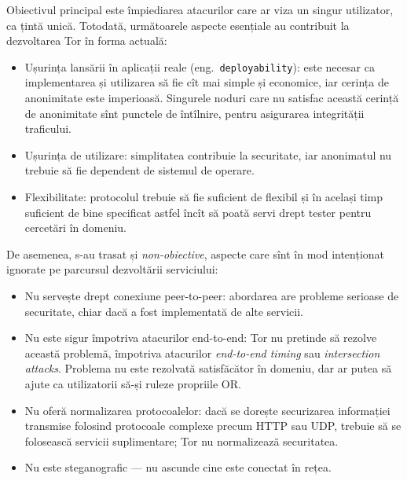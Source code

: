 \indent\indent Obiectivul principal este împiediarea atacurilor care ar viza un singur
utilizator, ca țintă unică. Totodată, următoarele aspecte esențiale au
contribuit la dezvoltarea Tor în forma actuală:
\begin{itemize}
  \item Ușurința lansării în aplicații reale (eng.\ \texttt{deployability}): este
    necesar ca implementarea și utilizarea să fie cît mai simple și
    economice, iar cerința de anonimitate este imperioasă. Singurele
    noduri care nu satisfac această cerință de anonimitate sînt punctele
    de întîlnire, pentru asigurarea integrității traficului.
  \item Ușurința de utilizare: simplitatea contribuie la se\-cu\-ri\-ta\-te, iar
    a\-no\-ni\-ma\-tul nu tre\-bu\-ie să fie dependent de sistemul de operare.
  \item Flexibilitate: protocolul trebuie să fie suficient de flexibil și
    în același timp suficient de bine specificat astfel încît să poată
    servi drept tester pentru cercetări în domeniu.
\end{itemize}

De asemenea, s-au trasat și \emph{non-obiective}, aspecte care sînt
în mod intenționat ignorate pe parcursul dezvoltării serviciului:
\begin{itemize}
  \item Nu servește drept conexiune peer-to-peer: abordarea are probleme
    serioase de securitate, chiar dacă a fost implementată de alte servicii.
  \item Nu este sigur împotriva atacurilor end-to-end: Tor nu pretinde
    să rezolve această problemă, împotriva atacurilor \emph{end-to-end timing}
    sau \emph{intersection attacks}. Problema nu este rezolvată satisfăcător
    în domeniu, dar ar putea să ajute ca utilizatorii să-și ruleze propriile
    OR.
  \item Nu oferă normalizarea protocoalelor: dacă se dorește securizarea
    informației transmise folosind protocoale complexe precum HTTP sau UDP,
    trebuie să se folosească servicii suplimentare; Tor nu normalizează securitatea.
  \item Nu este steganografic --- nu ascunde cine este conectat în rețea.
\end{itemize}

